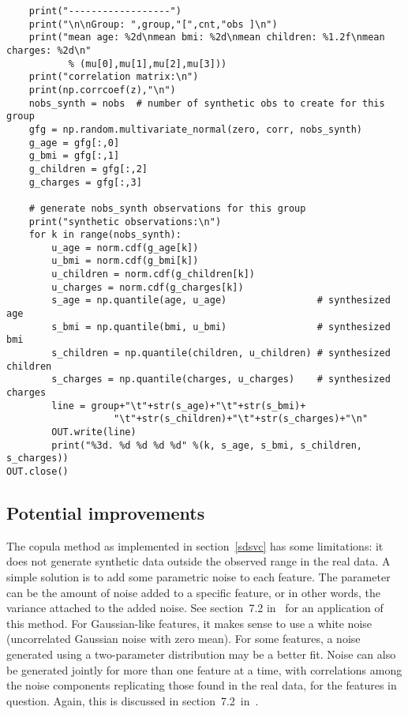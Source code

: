 \documentclass[oneside,10pt]{book}
\begin{document}
\begin{lstlisting}
    print("------------------")
    print("\n\nGroup: ",group,"[",cnt,"obs ]\n") 
    print("mean age: %2d\nmean bmi: %2d\nmean children: %1.2f\nmean charges: %2d\n" 
           % (mu[0],mu[1],mu[2],mu[3]))  
    print("correlation matrix:\n")
    print(np.corrcoef(z),"\n")
    nobs_synth = nobs  # number of synthetic obs to create for this group
    gfg = np.random.multivariate_normal(zero, corr, nobs_synth) 
    g_age = gfg[:,0]
    g_bmi = gfg[:,1]
    g_children = gfg[:,2]
    g_charges = gfg[:,3]

    # generate nobs_synth observations for this group
    print("synthetic observations:\n")
    for k in range(nobs_synth):   
        u_age = norm.cdf(g_age[k])
        u_bmi = norm.cdf(g_bmi[k])
        u_children = norm.cdf(g_children[k])
        u_charges = norm.cdf(g_charges[k])
        s_age = np.quantile(age, u_age)                # synthesized age 
        s_bmi = np.quantile(bmi, u_bmi)                # synthesized bmi
        s_children = np.quantile(children, u_children) # synthesized children
        s_charges = np.quantile(charges, u_charges)    # synthesized charges
        line = group+"\t"+str(s_age)+"\t"+str(s_bmi)+
                   "\t"+str(s_children)+"\t"+str(s_charges)+"\n"
        OUT.write(line)
        print("%3d. %d %d %d %d" %(k, s_age, s_bmi, s_children, s_charges))
OUT.close()
\end{lstlisting}

\subsection{Potential improvements}\label{babel99}

The copula method as implemented in section~\ref{sdsvc} has some limitations: it does not generate synthetic data outside the observed range in the real data. A simple solution is to add some parametric noise to each feature. The parameter can be the amount of noise added to a specific 
 feature, or in other words, the variance attached to the added noise. See section~7.2 in~\cite{vgelsevier} for an application of this method. For Gaussian-like features, it makes sense to use a white noise (uncorrelated
 Gaussian noise with zero mean). For some features, a noise generated using a two-parameter distribution may be a better fit. Noise can also be generated jointly for more than one feature at a time, with correlations among the noise components replicating those found in the real data, for the features in question. 
 Again, this is discussed in section~7.2~in~\cite{vgelsevier}.
\end{document}
